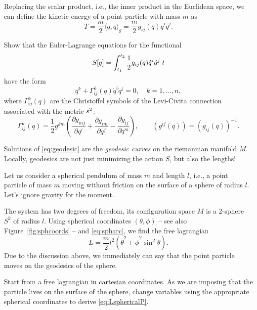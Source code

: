 \documentclass[english,fontsize=11pt,paper=a5,oneside]{scrbook}
\newcommand{\lag}{\langle}
\newcommand{\rag}{\rangle}
\let\d\relax
\DeclareMathOperator{\d}{d}
\theoremstyle{definition}
\newenvironment{example}
  {\pushQED{\qed}\renewcommand{\qedsymbol}{$\lozenge$}\examplex}
  {\popQED\endexamplex}
\newenvironment{exercise}
  {\pushQED{\qed}\renewcommand{\qedsymbol}{$\maltese$}\exercisex}
  {\popQED\endexercisex}
\begin{document}
Replacing the scalar product, i.e., the inner product in the Euclidean space, we can define the kinetic energy of a point particle with mass $m$ as
\begin{equation}
    T = \frac m2 \lag\dot q, \dot q\rag_g = \frac{m}2 g_{ij}(q)\dot q^i\dot q^j.
\end{equation}

\begin{exercise}\label{exe:geodesic1}
    Show that the Euler-Lagrange equations for the functional
    \begin{equation}
        S[q] = \int_{t_1}^{t_2} \frac 12 g_{ij}(q) \dot q^i \dot q^j\; \d t
    \end{equation}
    have the form
    \begin{equation}\label{eq:geodesic}
        \ddot q^k + \Gamma_{ij}^k(q) \dot q^i \dot q^j = 0, \quad k=1,\ldots, n,
    \end{equation}
    where $\Gamma_{ij}^k(q)$ are the Christoffel symbols of the Levi-Civita connection associated with the metric $\d s^2$:
    \begin{equation}
        \Gamma_{ij}^k(q) = \frac12 g^{km}\left(
            \frac{\partial g_{mj}}{\partial q^i} + \frac{\partial g_{im}}{\partial q^j}-\frac{\partial g_{ij}}{\partial q^m}
            \right),
        \qquad (g^{ij}(q)) = (g_{ij}(q))^{-1}.
    \end{equation}
\end{exercise}

Solutions of \eqref{eq:geodesic} are the \emph{geodesic curves} on the riemannian manifold $M$. Locally, geodesics are not just minimizing the action $S$, but also the lengths!

\begin{example}\label{ex:sphericalP}
    Let us consider a spherical pendulum of mass $m$ and length $l$, i.e., a point particle of mass $m$ moving without friction on the surface of a sphere of radius $l$.
    Let's ignore gravity for the moment.
    
    The system has two degrees of freedom, its configuration space $M$ is a 2-sphere $S^2$ of radius $l$.
    Using spherical coordinates $(\theta, \phi)$ -- see also Figure~\ref{fig:sphcoords} -- and \eqref{eq:spharc}, we find the free lagrangian
    \begin{equation}\label{eq:LsphericalP}
        L = \frac m2 l^2(\dot \theta^2 + \dot \phi^2 \sin^2\theta).
    \end{equation}
    Due to the discussion above, we immediately can say that the point particle moves on the geodesics of the sphere.

    \begin{exercise}
        Start from a free lagrangian in cartesian coordinates.
        As we are imposing that the particle lives on the surface of the sphere, change variables using the appropriate spherical coordinates to derive \eqref{eq:LsphericalP}.
    \end{exercise}
\end{example}
\end{document}
